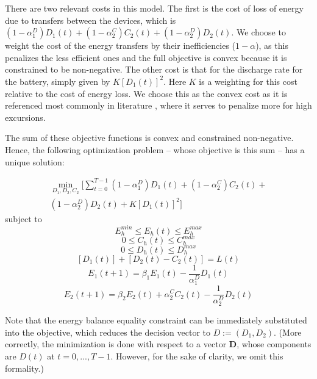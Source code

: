 \documentclass[conference]{IEEEtran}
\begin{document}
There are two relevant costs in this model. The first is the cost of loss of energy due to transfers between the devices, which is $(1-\alpha_{1}^{D})D_{1}(t)+(1-\alpha_{2}^{C})C_{2}(t)+(1-\alpha_{2}^{D})D_{2}(t)$. We choose to weight the cost of the energy transfers by their inefficiencies ($1-\alpha$), as this penalizes the less efficient ones and the full objective is convex because it is constrained to be non-negative. The other cost is that for the discharge rate for the battery, simply given by $K\left[D_{1}(t)\right]^{2}$. Here $K$ is a weighting for this cost relative to the cost of energy loss. We choose this as the convex cost as it is referenced most commonly in literature \cite{bambang2014energy}, where it serves to penalize more for high excursions.

The sum of these objective functions is convex and constrained non-negative. Hence, the following optimization problem -- whose objective is this sum -- has a unique solution:

\begin{multline} \label{eq:initCostFnc}
    \min_{D_{1},D_{2},C_{2}}\Biggl[\sum_{t=0}^{T-1}
	(1-\alpha_{1}^{D})D_{1}(t)+
	(1-\alpha_{2}^{C})C_{2}(t)+\\
	(1-\alpha_{2}^{D})D_{2}(t)+
	K\left[D_{1}(t)\right]^{2}
	\Biggr]\end{multline}
subject to
\begin{displaymath}E_{h}^{min}\leq E_{h}(t)\leq E_{h}^{max}\end{displaymath}
\begin{displaymath}0\leq C_{h}(t)\leq C_{h}^{max}\end{displaymath}
\begin{displaymath}0\leq D_{h}(t)\leq D_{h}^{max}\end{displaymath}
\begin{displaymath}\left[D_{1}(t)\right] + \left[D_{2}(t) - C_{2}(t)\right] = L(t)\end{displaymath}
\begin{displaymath}E_{1}(t+1)=\beta_{1}E_{1}(t)-\frac{1}{\alpha_{1}^{D}}D_{1}(t)\end{displaymath}
\begin{displaymath}E_{2}(t+1)=\beta_{2}E_{2}(t)+\alpha_{2}^{C}C_{2}(t)-\frac{1}{\alpha_{2}^{D}}D_{2}(t)\end{displaymath}

Note that the energy balance equality constraint can be immediately substituted into the objective, which reduces the decision vector to $D:=(D_{1},D_{2})$. (More correctly, the minimization is done with respect to a vector $\textbf{D}$, whose components are $D(t)$ at $t=0,...,T-1$.  However, for the sake of clarity, we omit this formality.)
\end{document}
